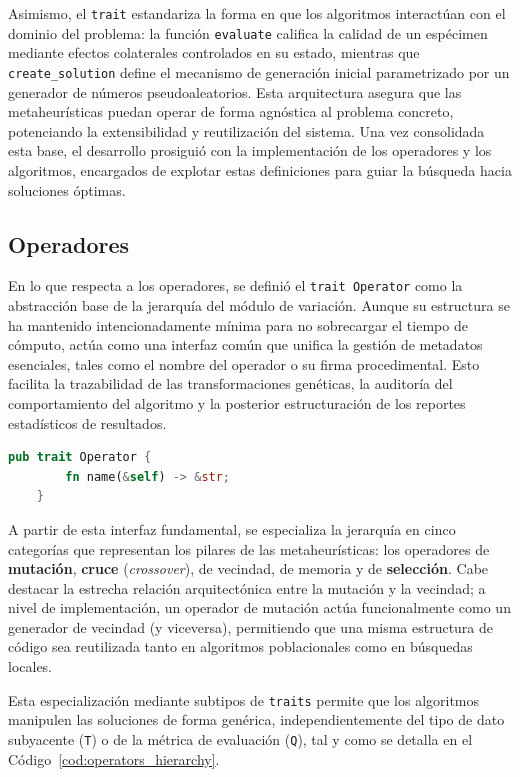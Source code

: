 \documentclass[12pt,a4paper,twoside,openright]{book}
\begin{document}
        Asimismo, el \texttt{trait} estandariza la forma en que los algoritmos interactúan con el dominio del problema: la función \texttt{evaluate} califica la calidad de un espécimen mediante efectos colaterales controlados en su estado, mientras que \texttt{create\_solution} define el mecanismo de generación inicial parametrizado por un generador de números pseudoaleatorios. Esta arquitectura asegura que las metaheurísticas puedan operar de forma agnóstica al problema concreto, potenciando la extensibilidad y reutilización del sistema. Una vez consolidada esta base, el desarrollo prosiguió con la implementación de los operadores y los algoritmos, encargados de explotar estas definiciones para guiar la búsqueda hacia soluciones óptimas.

    \subsection{Operadores}
        En lo que respecta a los operadores, se definió el \texttt{trait Operator} como la abstracción base de la jerarquía del módulo de variación. Aunque su estructura se ha mantenido intencionadamente mínima para no sobrecargar el tiempo de cómputo, actúa como una interfaz común que unifica la gestión de metadatos esenciales, tales como el nombre del operador o su firma procedimental. Esto facilita la trazabilidad de las transformaciones genéticas, la auditoría del comportamiento del algoritmo y la posterior estructuración de los reportes estadísticos de resultados.

    \begin{lstlisting}[language=Rust, caption={Interfaz base \texttt{Operator} para la identificación de componentes.},
        label={lst:base_operator}]
    pub trait Operator {
        fn name(&self) -> &str;
    }
    \end{lstlisting}

        A partir de esta interfaz fundamental, se especializa la jerarquía en cinco categorías que representan los pilares de las metaheurísticas: los operadores de \textbf{mutación}, \textbf{cruce} (\emph{crossover}), de vecindad, de memoria y de \textbf{selección}. Cabe destacar la estrecha relación arquitectónica entre la mutación y la vecindad; a nivel de implementación, un operador de mutación actúa funcionalmente como un generador de vecindad (y viceversa), permitiendo que una misma estructura de código sea reutilizada tanto en algoritmos poblacionales como en búsquedas locales. 
        
        Esta especialización mediante subtipos de \texttt{traits} permite que los algoritmos manipulen las soluciones de forma genérica, independientemente del tipo de dato subyacente (\texttt{T}) o de la métrica de evaluación (\texttt{Q}), tal y como se detalla en el Código~\ref{cod:operators_hierarchy}.
\end{document}
